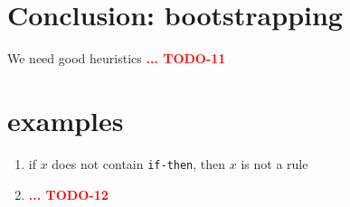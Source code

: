 \documentclass[11pt,a4paper,svgnames]{article}
\begin{document}
  \section{Conclusion: bootstrapping}
  \label{sec:concl-bootstrap}
  We need good heuristics
  {\textcolor{red}{\textbf{... TODO-11}}}

  \section*{examples}
  \label{sec:examples}

  \begin{enumerate}
  \item if $x$ does not contain \texttt{if-then}, then $x$ is not a rule
    \item
      {\textcolor{red}{\textbf{... TODO-12}}}

  \end{enumerate}

\clearpage
{}



\end{document}
